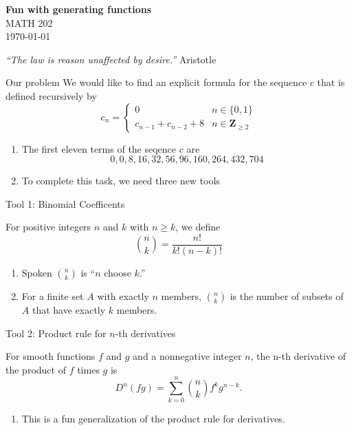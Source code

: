\documentclass[portrait,fleqn,12pt]{beamer}
\newcommand{\integers}{\mathbf{Z}}
\newenvironment{handlist}
   {\begin{enumerate}[\faHandPointRight]
       \addtolength{\itemsep}{0.0\itemsep}}
     {\end{enumerate}}
\begin{document}
\begin{frame}
\begin{flushleft} 
\textbf{Fun with generating functions} \\
MATH 202 \\
\today 
\end{flushleft}


\emph{“The law is reason unaffected by desire.”} \hfill {\sc Aristotle } 
\end{frame}


\begin{frame}[fragile]{Our problem}
We would like to find an explicit formula for the sequence $c$ that is defined recursively by
\begin{equation}
  c_n= \begin{cases} 0 & n \in \{0,1\} \\
                                 c_{n-1} + c_{n-2}+ 8 & n \in \integers_{\geq 2}
           \end{cases}
\end{equation}
\begin{handlist}
\item The first eleven terms of the seqence $c$ are
\begin{equation}
      0,0,8,16,32,56,96,160,264,432,704
\end{equation}
\item To complete this task, we need three new tools
\end{handlist}
\end{frame}
\begin{frame}{Tool 1:  Binomial Coefficents}

For positive integers $n$ and $k$ with $n \geq k$, we define
\begin{equation}
      \binom{n}{k} = \frac{n!}{k! (n-k)!}
\end{equation}
\begin{handlist}
 \item Spoken $\binom{n}{k}$ is ``$n$ choose $k$.''
 \item For a finite set $A$ with exactly $n$ members,  $\binom{n}{k}$ is the number of subsets of $A$ that have exactly $k$ members.
\end{handlist}
\end{frame}

\begin{frame}{Tool 2:  Product rule for $n$-th derivatives}

For smooth functions $f$ and $g$ and a nonnegative integer $n$, the n-th derivative of the product of $f$ times $g$ is
\begin{equation}
       D^n (f g) = \sum_{k=0}^n  \binom{n}{k}  f^{k} g^{n-k}.
\end{equation}
\begin{handlist}
\item This is a fun generalization of the product rule for derivatives.
\end{handlist}
\end{frame}
\end{document}
